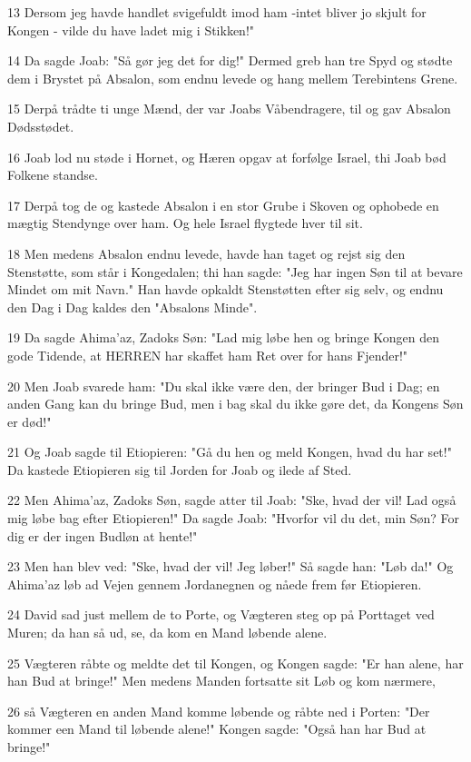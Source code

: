 \par 13 Dersom jeg havde handlet svigefuldt imod ham -intet bliver jo skjult for Kongen - vilde du have ladet mig i Stikken!"
\par 14 Da sagde Joab: "Så gør jeg det for dig!" Dermed greb han tre Spyd og stødte dem i Brystet på Absalon, som endnu levede og hang mellem Terebintens Grene.
\par 15 Derpå trådte ti unge Mænd, der var Joabs Våbendragere, til og gav Absalon Dødsstødet.
\par 16 Joab lod nu støde i Hornet, og Hæren opgav at forfølge Israel, thi Joab bød Folkene standse.
\par 17 Derpå tog de og kastede Absalon i en stor Grube i Skoven og ophobede en mægtig Stendynge over ham. Og hele Israel flygtede hver til sit.
\par 18 Men medens Absalon endnu levede, havde han taget og rejst sig den Stenstøtte, som står i Kongedalen; thi han sagde: "Jeg har ingen Søn til at bevare Mindet om mit Navn." Han havde opkaldt Stenstøtten efter sig selv, og endnu den Dag i Dag kaldes den "Absalons Minde".
\par 19 Da sagde Ahima'az, Zadoks Søn: "Lad mig løbe hen og bringe Kongen den gode Tidende, at HERREN har skaffet ham Ret over for hans Fjender!"
\par 20 Men Joab svarede ham: "Du skal ikke være den, der bringer Bud i Dag; en anden Gang kan du bringe Bud, men i bag skal du ikke gøre det, da Kongens Søn er død!"
\par 21 Og Joab sagde til Etiopieren: "Gå du hen og meld Kongen, hvad du har set!" Da kastede Etiopieren sig til Jorden for Joab og ilede af Sted.
\par 22 Men Ahima'az, Zadoks Søn, sagde atter til Joab: "Ske, hvad der vil! Lad også mig løbe bag efter Etiopieren!" Da sagde Joab: "Hvorfor vil du det, min Søn? For dig er der ingen Budløn at hente!"
\par 23 Men han blev ved: "Ske, hvad der vil! Jeg løber!" Så sagde han: "Løb da!" Og Ahima'az løb ad Vejen gennem Jordanegnen og nåede frem før Etiopieren.
\par 24 David sad just mellem de to Porte, og Vægteren steg op på Porttaget ved Muren; da han så ud, se, da kom en Mand løbende alene.
\par 25 Vægteren råbte og meldte det til Kongen, og Kongen sagde: "Er han alene, har han Bud at bringe!" Men medens Manden fortsatte sit Løb og kom nærmere,
\par 26 så Vægteren en anden Mand komme løbende og råbte ned i Porten: "Der kommer een Mand til løbende alene!" Kongen sagde: "Også han har Bud at bringe!"
